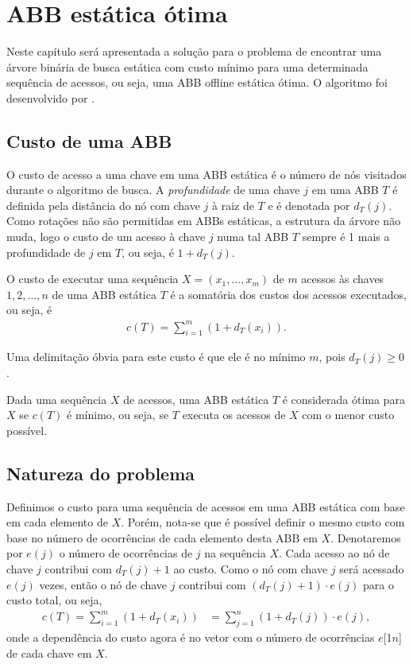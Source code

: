 
\chapter{ABB estática ótima}
\label{cap:abb-estatica-otima}

Neste capítulo será apresentada a solução para o problema de encontrar uma árvore binária de busca estática com custo mínimo para uma determinada sequência de acessos, ou seja, uma ABB offline estática ótima. O algoritmo foi desenvolvido por \cite{knuth}.

\section{Custo de uma ABB}

O custo de acesso a uma chave em uma ABB estática é o número de nós visitados durante o algoritmo de busca. A \textit{profundidade} de uma chave $j$ em uma ABB $T$ é definida pela distância do nó com chave $j$ à raiz de $T$ e é denotada por $d_T(j)$. Como rotações não são permitidas em ABBs estáticas, a estrutura da árvore não muda, logo o custo de um acesso à chave $j$ numa tal ABB $T$ sempre é 1 mais a profundidade de $j$ em $T$, ou seja, é $1 + d_T(j)$.

O custo de executar uma sequência $X = (x_{1},\ldots,x_{m})$ de $m$ acessos às chaves $1, 2,\ldots,n$ de uma ABB estática $T$ é a somatória dos custos dos acessos executados, ou seja, é
\begin{align*}
c(T) = \sum_{i=1}^{m} (1 + d_T(x_i)).
\end{align*}

Uma delimitação óbvia para este custo é que ele é no mínimo $m$, pois $d_T(j) \geq 0$.

Dada uma sequência $X$ de acessos, uma ABB estática $T$ é considerada ótima para $X$ se $c(T)$ é mínimo, ou seja, se $T$ executa os acessos de $X$ com o menor custo possível.

\section{Natureza do problema}

Definimos o custo para uma sequência de acessos em uma ABB estática com base em cada elemento de $X$. Porém, nota-se que é possível definir o mesmo custo com base no número de ocorrências de cada elemento desta ABB em $X$. Denotaremos por $e(j)$ o número de ocorrências de $j$ na sequência $X$.
Cada acesso ao nó de chave $j$ contribui com $d_T(j) + 1$ ao custo. Como o nó com chave $j$ será acessado $e(j)$ vezes, então o nó de chave $j$ contribui com $(d_T(j) + 1)  \cdot e(j)$ para o custo total, ou seja,
\begin{align*}
c(T) = \sum_{i=1}^{m} (1 + d_T(x_i)) &= \sum_{j=1}^{n} (1 + d_T(j)) \cdot e(j),
\end{align*}
onde a dependência do custo agora é no vetor com o número de ocorrências $e$[1\tdots$n$] de cada chave em $X$.

